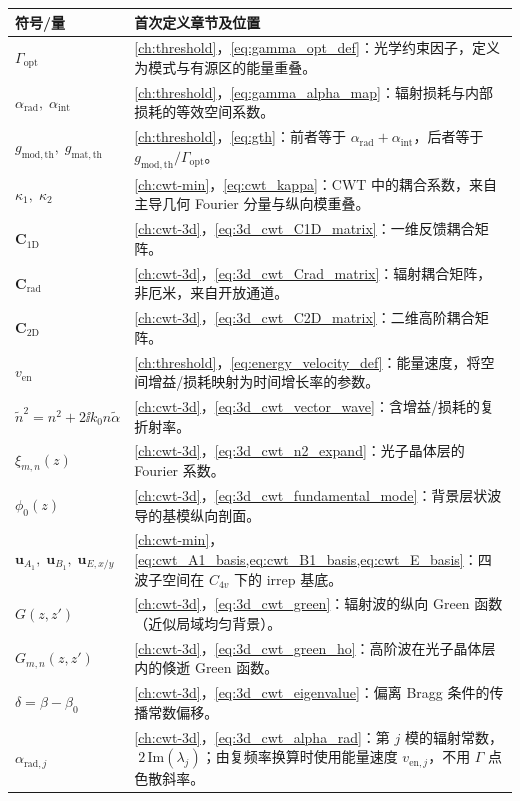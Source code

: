 \begin{longtable}{p{}p{}}
\toprule
符号/量 & 首次定义章节及位置 \\
\midrule
\endhead
$\Gamma_{\mathrm{opt}}$ & \cref{ch:threshold}，\cref{eq:gamma_opt_def}：光学约束因子，定义为模式与有源区的能量重叠。 \\
$\alpha_{\mathrm{rad}},\;\alpha_{\mathrm{int}}$ & \cref{ch:threshold}，\cref{eq:gamma_alpha_map}：辐射损耗与内部损耗的等效空间系数。 \\
$g_{\mathrm{mod,th}},\;g_{\mathrm{mat,th}}$ & \cref{ch:threshold}，\cref{eq:gth}：前者等于 $\alpha_{\mathrm{rad}}+\alpha_{\mathrm{int}}$，后者等于 $g_{\mathrm{mod,th}}/\Gamma_{\mathrm{opt}}$。 \\
$\kappa_1,\;\kappa_2$ & \cref{ch:cwt-min}，\cref{eq:cwt_kappa}：CWT 中的耦合系数，来自主导几何 Fourier 分量与纵向模重叠。 \\
$\bm{C}_{\mathrm{1D}}$ & \cref{ch:cwt-3d}，\cref{eq:3d_cwt_C1D_matrix}：一维反馈耦合矩阵。 \\
$\bm{C}_{\mathrm{rad}}$ & \cref{ch:cwt-3d}，\cref{eq:3d_cwt_Crad_matrix}：辐射耦合矩阵，非厄米，来自开放通道。 \\
$\bm{C}_{\mathrm{2D}}$ & \cref{ch:cwt-3d}，\cref{eq:3d_cwt_C2D_matrix}：二维高阶耦合矩阵。 \\
$v_{\mathrm{en}}$ & \cref{ch:threshold}，\cref{eq:energy_velocity_def}：能量速度，将空间增益/损耗映射为时间增长率的参数。 \\
$\tilde n^2=n^2+2\ii k_0 n\tilde\alpha$ & \cref{ch:cwt-3d}，\cref{eq:3d_cwt_vector_wave}：含增益/损耗的复折射率。 \\
$\xi_{m,n}(z)$ & \cref{ch:cwt-3d}，\cref{eq:3d_cwt_n2_expand}：光子晶体层的 Fourier 系数。 \\
$\phi_0(z)$ & \cref{ch:cwt-3d}，\cref{eq:3d_cwt_fundamental_mode}：背景层状波导的基模纵向剖面。 \\
$\bm{u}_{A_1},\;\bm{u}_{B_1},\;\bm{u}_{E,x/y}$ & \cref{ch:cwt-min}，\cref{eq:cwt_A1_basis,eq:cwt_B1_basis,eq:cwt_E_basis}：四波子空间在 $C_{4v}$ 下的 irrep 基底。 \\
$G(z,z')$ & \cref{ch:cwt-3d}，\cref{eq:3d_cwt_green}：辐射波的纵向 Green 函数（近似局域均匀背景）。 \\
$G_{m,n}(z,z')$ & \cref{ch:cwt-3d}，\cref{eq:3d_cwt_green_ho}：高阶波在光子晶体层内的倏逝 Green 函数。 \\
$\delta=\beta-\beta_0$ & \cref{ch:cwt-3d}，\cref{eq:3d_cwt_eigenvalue}：偏离 Bragg 条件的传播常数偏移。 \\
$\alpha_{\mathrm{rad},j}$ & \cref{ch:cwt-3d}，\cref{eq:3d_cwt_alpha_rad}：第 $j$ 模的辐射常数，$\;2\,\mathrm{Im}(\lambda_j)$；由复频率换算时使用能量速度 $v_{\mathrm{en},j}$，不用 $\Gamma$ 点色散斜率。 \\

\end{longtable}
